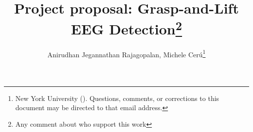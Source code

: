 \documentclass[final,leqno,onefignum,onetabnum]{siamltexmm}
\title{Project proposal: Grasp-and-Lift EEG Detection\thanks{Any comment about who support this work}}
\author{Anirudhan Jegannathan Rajagopalan, Michele Cer\'u\thanks{New York University (\email{anirudhan.jegannathan@nyu.edu; mc3784@nyu.edu}). Questions, comments, or corrections
to this document may be directed to that email address.}}
\begin{document}
\maketitle
\newcommand{\slugmaster}{%
\slugger{siads}{xxxx}{xx}{x}{x--x}}%

\begin{abstract}
\end{abstract}

\begin{keywords}\end{keywords}

\begin{AMS}\end{AMS}


  \pagestyle{myheadings}
  \thispagestyle{plain}
\end{document}
